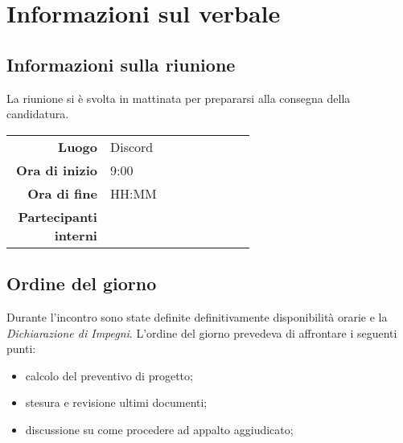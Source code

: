 \section{Informazioni sul verbale}

\subsection{Informazioni sulla riunione}
La riunione si è svolta in mattinata per prepararsi alla consegna della candidatura.

\begin{center}
	\begin{tabular}{r|p{0.6\linewidth}}
		\toprule
		\textbf{Luogo} & Discord \\
		\textbf{Ora di inizio} & 9:00 \\
		\textbf{Ora di fine} & HH:MM \\
		\textbf{Partecipanti interni} & \groupTeam
	\end{tabular}
\end{center}

\medskip

\subsection{Ordine del giorno}
Durante l'incontro sono state definite definitivamente disponibilità orarie e la \textit{Dichiarazione di Impegni}. L'ordine del giorno prevedeva di affrontare i seguenti punti:
\begin{itemize}
	\item calcolo del preventivo di progetto;
	\item stesura e revisione ultimi documenti;
	\item discussione su come procedere ad appalto aggiudicato;
\end{itemize}
